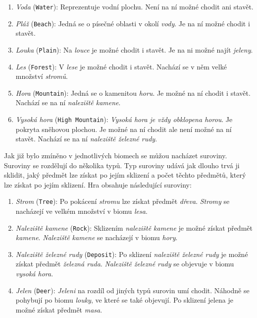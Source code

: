 \begin{enumerate}
    \item \textit{Voda} (\verb|Water|): Reprezentuje vodní plochu. Není na ní možné chodit ani stavět.
    \item \textit{Pláž} (\verb|Beach|): Jedná se o písečné oblasti v okolí \textit{vody}. Je na ní možné chodit i stavět.
    \item \textit{Louka} (\verb|Plain|): Na \textit{louce} je možné chodit i stavět. Je na ni možné najít \textit{jeleny}.
    \item \textit{Les} (\verb|Forest|): V \textit{lese} je možné chodit i stavět. Nachází se v něm velké množství \textit{stromů}.
    \item \textit{Hora} (\verb|Mountain|): Jedná se o kamenitou \textit{horu}. Je možné na ní chodit i stavět. Nachází se na ní \textit{naleziště kamene}.
    \item \textit{Vysoká hora} (\verb|High Mountain|): \textit{Vysoká hora je vždy obklopena \textit{horou}}. Je pokryta sněhovou plochou. Je možné na ní chodit ale není možné na ní stavět. Nachází se na ní \textit{naleziště železné rudy}.
\end{enumerate}

Jak již bylo zmíněno v jednotlivých biomech se můžou nacházet suroviny. Suroviny se rozdělují do několika typů. Typ suroviny udává jak dlouho trvá ji sklidit, jaký předmět lze získat po jejím sklizení a počet těchto předmětů, který lze získat po jejím sklizení. Hra obsahuje následující suroviny:

\begin{enumerate}
    \item \textit{Strom} (\verb|Tree|): Po pokácení \textit{stromu} lze získat předmět \textit{dřeva}. \textit{Stromy} se nacházejí ve velkém množství v biomu \textit{lesa}.
    \item \textit{Naleziště kamene} (\verb|Rock|): Sklizením \textit{naleziště kamene} je možné získat předmět \textit{kamene}. \textit{Naleziště kamene} se nacházejí v biomu \textit{hory}.
    \item \textit{Naleziště železné rudy} (\verb|Deposit|): Po sklizení \textit{naleziště železné rudy} je možné získat předmět \textit{železná ruda}. \textit{Naleziště železné rudy} se objevuje v biomu \textit{vysoká hora}.
    \item \textit{Jelen} (\verb|Deer|): \textit{Jeleni} na rozdíl od jiných typů surovin umí chodit. Náhodně se pohybují po biomu \textit{louky}, ve které se také objevují. Po sklizení jelena je možné získat předmět \textit{masa}.
\end{enumerate}

